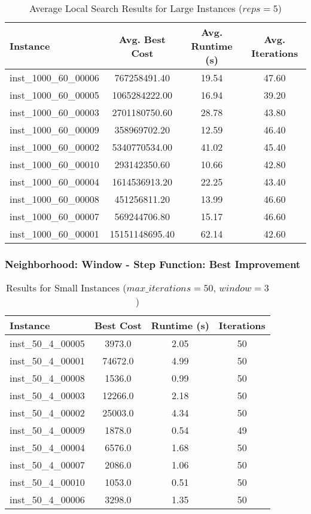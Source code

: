 \documentclass{article}
\begin{document}
\begin{table}[ht]
\centering
\caption{Average Local Search Results for Large Instances ($reps=5$)}
\hspace*{-1cm}
\begin{tabular}{lccc}
\toprule
\textbf{Instance} & \textbf{Avg. Best Cost} & \textbf{Avg. Runtime (s)} & \textbf{Avg. Iterations} \\
\midrule
inst\_1000\_60\_00006 & 767258491.40   & 19.54  & 47.60 \\
inst\_1000\_60\_00005 & 1065284222.00  & 16.94  & 39.20 \\
inst\_1000\_60\_00003 & 2701180750.60  & 28.78  & 43.80 \\
inst\_1000\_60\_00009 & 358969702.20   & 12.59  & 46.40 \\
inst\_1000\_60\_00002 & 5340770534.00  & 41.02  & 45.40 \\
inst\_1000\_60\_00010 & 293142350.60   & 10.66  & 42.80 \\
inst\_1000\_60\_00004 & 1614536913.20  & 22.25  & 43.40 \\
inst\_1000\_60\_00008 & 451256811.20   & 13.99  & 46.60 \\
inst\_1000\_60\_00007 & 569244706.80   & 15.17  & 46.60 \\
inst\_1000\_60\_00001 & 15151148695.40 & 62.14  & 42.60 \\
\bottomrule
\end{tabular}
\label{tab:average_results_500_40}
\end{table}

\subsubsection*{Neighborhood: Window - Step Function: Best Improvement}

\begin{table}[H]
\centering
\caption{Results for Small Instances ($max\_iterations=50$, $window=3$)}
\begin{tabular}{lccc}
\toprule
\textbf{Instance} & \textbf{Best Cost} & \textbf{Runtime (s)} & \textbf{Iterations} \\
\midrule
inst\_50\_4\_00005 & 3973.0   & 2.05  & 50 \\
inst\_50\_4\_00001 & 74672.0  & 4.99  & 50 \\
inst\_50\_4\_00008 & 1536.0   & 0.99  & 50 \\
inst\_50\_4\_00003 & 12266.0  & 2.18  & 50 \\
inst\_50\_4\_00002 & 25003.0  & 4.34  & 50 \\
inst\_50\_4\_00009 & 1878.0   & 0.54  & 49 \\
inst\_50\_4\_00004 & 6576.0   & 1.68  & 50 \\
inst\_50\_4\_00007 & 2086.0   & 1.06  & 50 \\
inst\_50\_4\_00010 & 1053.0   & 0.51  & 50 \\
inst\_50\_4\_00006 & 3298.0   & 1.35  & 50 \\
\bottomrule
\end{tabular}
\label{tab:results_50_4}
\end{table}
\end{document}
